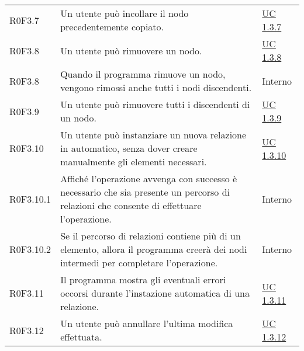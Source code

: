 \begin{center}
\begin{longtable}{p{4.2cm}!{\color{white}\vrule width 0.5mm}p{6cm}!{\color{white}\vrule width 0.5mm}p{2.5cm}!{\color{white}\vrule width 0.5mm}}
			\hspace{2mm}\hypertarget{XER0F3.7}{R0F3.7} & Un utente può incollare il nodo precedentemente copiato. & \hyperref[subsec:XEUC1.3.7]{UC 1.3.7}\\
	
			\hspace{2mm}\hypertarget{XER0F3.8}{R0F3.8} & Un utente può rimuovere un nodo. & \hyperref[subsec:XEUC1.3.8]{UC 1.3.8}\\
				
				\hspace{4mm}\hypertarget{XER0F3.8}{R0F3.8} & Quando il programma rimuove un nodo, vengono rimossi anche tutti i nodi discendenti. & Interno\\
	
			\hspace{2mm}\hypertarget{XER0F3.9}{R0F3.9} & Un utente può rimuovere tutti i discendenti di un nodo. & \hyperref[subsec:XEUC1.3.9]{UC 1.3.9}\\
			
			\hspace{2mm}\hypertarget{XER0F3.10}{R0F3.10} & Un utente può instanziare un nuova relazione in automatico, senza dover creare manualmente gli elementi necessari. & \hyperref[subsec:XEUC1.3.10]{UC 1.3.10}\\
			
				\hspace{4mm}\hypertarget{XER0F3.10.1}{R0F3.10.1} & Affiché l'operazione avvenga con successo è necessario che sia presente un percorso di relazioni che consente di effettuare l'operazione. & Interno\\
	
				\hspace{4mm}\hypertarget{XER0F3.10.2}{R0F3.10.2} & Se il percorso di relazioni contiene più di un elemento, allora il programma creerà dei nodi intermedi per completare l'operazione. & Interno\\
	
			\hspace{2mm}\hypertarget{XER0F3.11}{R0F3.11} & Il programma mostra gli eventuali errori occorsi durante l'instazione automatica di una relazione. & \hyperref[subsec:XEUC1.3.11]{UC 1.3.11}\\
	
	
			\hspace{2mm}\hypertarget{XER0F3.12}{R0F3.12} & Un utente può annullare l'ultima modifica effettuata. & \hyperref[subsec:XEUC1.3.12]{UC 1.3.12}\\
			

\end{longtable}
\end{center}
